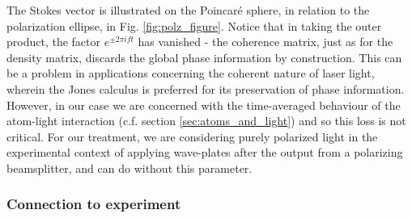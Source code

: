 	The Stokes vector is illustrated on the Poincar\'{e} sphere, in relation to the polarization ellipse, in Fig. \ref{fig:polz_figure}.
	Notice that in taking the outer product, the factor $e^{\pm2\pi i f t}$ has vanished - the coherence matrix, just as for the density matrix, discards the global phase information by construction. 
	This can be a problem in applications concerning the coherent nature of laser light, wherein the Jones calculus is preferred for its preservation of phase information.
	However, in our case we are concerned with the time-averaged behaviour of the atom-light interaction (c.f. section \ref{sec:atoms_and_light}) and so this loss is not critical.
	For our treatment, we are considering purely polarized light in the experimental context of applying wave-plates after the output from a polarizing beamsplitter, and can do without this parameter.


	\subsubsection*{Connection to experiment}
	\label{ssec:connection_to_experiment}

